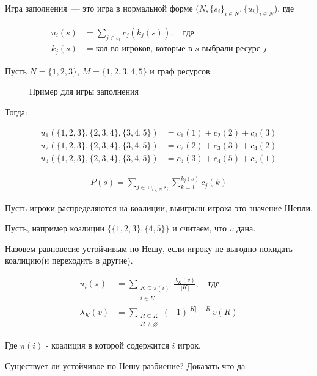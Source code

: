 \begin{df}
	Игра заполнения~--- это игра в нормальной форме $(N, \{s_i\}_{i \in N}, \{u_i\}_{i \in N}$), где 

	\begin{align*}
		u_i(s) &= \sum_{j \in s_i} c_j(k_j(s)), \quad \text{где} \\
		k_j(s) &= \text{кол-во игроков, которые в $s$ выбрали ресурс  $j$}
	\end{align*}

\end{df}

\begin{exmpl}
	Пусть $N = \{1, 2, 3\}, \, M = \{1, 2, 3, 4, 5\}$ и граф ресурсов:
\begin{figure}[ht]
    \centering
    \caption{Пример для игры заполнения}
    \label{fig:example-congestion-game}
\end{figure}

Тогда:

\begin{align*}
	u_1(\{1, 2, 3\}, \{2, 3, 4\}, \{3, 4, 5\}) &= c_1(1) + c_2(2) + c_3(3) \\
	u_2(\{1, 2, 3\}, \{2, 3, 4\}, \{3, 4, 5\}) &= c_2(2) + c_3(3) + c_4(2) \\
	u_3(\{1, 2, 3\}, \{2, 3, 4\}, \{3, 4, 5\}) &= c_3(3) + c_4(5) + c_5(1)
\end{align*}

\end{exmpl}

\begin{align*}
	P(s) = \sum_{j \in \cup_{i \in N} s_i} \sum_{k = 1}^{k_j(s)} c_j(k)
\end{align*}

\begin{problem}
	Пусть игроки распределяются на коалиции, выигрыш игрока это значение Шепли.

	Пусть, например коалиции $\{\{1, 2, 3\}, \{4, 5\}\}$ и считаем, что $v$ дана.

	Назовем равновесие устойчивым по Нешу, если игроку не выгодно покидать коалицию(и переходить в другие).

	\begin{align*}
		u_i(\pi) &= \sum_{\substack{K \subseteq \pi(i) \\ i \in K}} \frac{\lambda_K(v)}{|K|}, \quad \text{где} \\
		\lambda_K(v) &= \sum_{\substack{R \subseteq K \\ R \neq \varnothing}} (-1)^{|K| - |R|} v(R)
	\end{align*}

	Где $\pi(i)$ - коалиция в которой содержится  $i$ игрок.

	Существует ли устойчивое по Нешу разбиение? Доказать что да
\end{problem}

